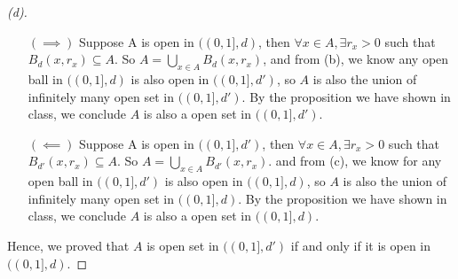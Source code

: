 \begin{proof}[(d)]
    \vphantom{text}
    \begin{itemize}
        \item [\((\implies )\)] Suppose A is open in $((0,1],d)$, then $\forall x\in A, \exists r_x > 0$ such that $B_d(x, r_x) \subseteq A$. So $A = \bigcup_{x\in A} B_d(x, r_x)$, and from (b), we know any open ball in $((0,1],d)$ is also open in $((0,1],d')$, so $A$ is also the union of infinitely many open set in $((0,1],d')$. By the proposition we have shown in class, we conclude $A$ is also a open set in $((0,1],d')$.
        \item [\((\impliedby )\)] Suppose A is open in $((0,1],d')$, then $\forall x\in A, \exists r_x > 0$ such that $B_{d'}(x, r_x) \subseteq A$. So $A = \bigcup_{x\in A} B_{d'}(x, r_x)$. and from (c), we know for any open ball in $((0,1],d')$ is also open in $((0,1],d)$, so $A$ is also the union of infinitely many open set in $((0,1],d)$. By the proposition we have shown in class, we conclude $A$ is also a open set in $((0,1],d)$.
    \end{itemize}
    Hence, we proved that $A$ is open set in $((0,1],d')$ if and only if it is open in $((0,1],d)$.
\end{proof} 

